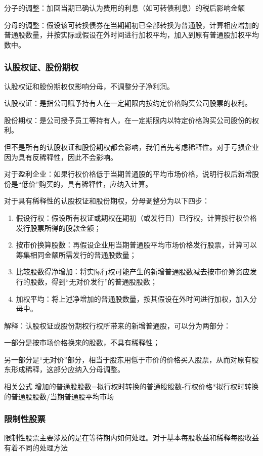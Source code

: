 \documentclass[UTF8,12pt]{ctexart}
\numberwithin{equation}{section} %
\numberwithin{figure}{section}
\numberwithin{table}{section}
\begin{document}
	分子的调整：加回当期已确认为费用的利息（如可转债利息）的税后影响金额
	
	分母的调整：假设该可转换债券在当期期初已全部转换为普通股，计算相应增加的普通股数量，并按实际或假设在外时间进行加权平均，加入到原有普通股加权平均数中。
	
	\subsubsection{认股权证、股份期权}
	认股权证和股份期权仅影响分母，不调整分子净利润。
	
	认股权证：是指公司赋予持有人在一定期限内按约定价格购买公司股票的权利。
	
	股份期权：是公司授予员工等持有人，在一定期限内以特定价格购买公司股份的权利。
	
	但不是所有的认股权证和股份期权都会影响，我们首先考虑稀释性。对于亏损企业因为具有反稀释性，因此不会影响。
	
	对于盈利企业：如果行权价格低于当期普通股的平均市场价格，说明行权后新增股份是“低价”购买的，具有稀释性，应纳入计算。
	
	对于具有稀释性的认股权证和股份期权，分母调整分为以下四步：
	\begin{enumerate}
		\item 假设行权：假设所有权证或期权在期初（或发行日）已行权，计算按行权价格发行股票所得的股款金额；
		
		\item 按市价换算股数：再假设企业用当期普通股平均市场价格发行股票，计算可以筹集相同金额所需发行的普通股数量；
		
		\item 比较股数得净增加：将实际行权可能产生的新增普通股数减去按市价筹资应发行的股数，得到“无对价发行”的普通股股数；
		
		\item 加权平均：将上述净增加的普通股数量，按其假设在外时间进行加权，加入分母中。
	\end{enumerate}
	
	解释：认股权证或股份期权行权所带来的新增普通股，可以分为两部分：
	
	一部分是按市场价格换来的股数，不具有稀释性；
	
	另一部分是“无对价”部分，相当于股东用低于市价的价格买入股票，从而对原有股东形成稀释，这部分应纳入分母调整。

	相关公式
	增加的普通股股数=拟行权时转换的普通股股数-行权价格*拟行权时转换的普通股股数/当期普通股平均市场
	
	\subsubsection{限制性股票}
	限制性股票主要涉及的是在等待期内如何处理。对于基本每股收益和稀释每股收益有着不同的处理方法
\end{document}
